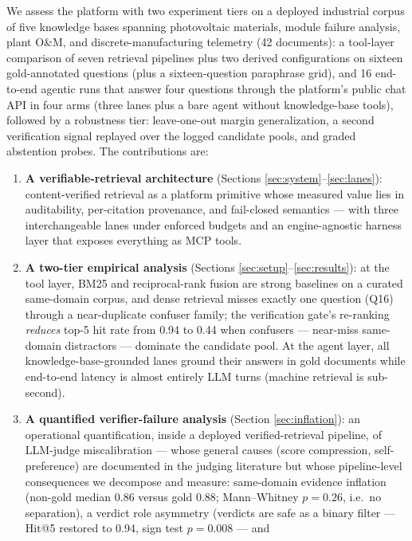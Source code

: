 We assess the platform with two experiment tiers on a deployed industrial
corpus of five knowledge bases spanning photovoltaic materials, module
failure analysis, plant O\&M, and discrete-manufacturing telemetry
(42 documents): a tool-layer
comparison of seven retrieval pipelines plus two derived configurations
on sixteen gold-annotated questions (plus a sixteen-question paraphrase
grid), and
16 end-to-end agentic runs that answer four questions through the platform's
public chat API in four arms (three lanes plus a bare agent without
knowledge-base tools), followed by a robustness tier: leave-one-out margin
generalization, a second verification signal replayed over the logged
candidate pools, and graded abstention probes. The contributions are:

\begin{enumerate}
\item \textbf{A verifiable-retrieval architecture} (Sections
\ref{sec:system}--\ref{sec:lanes}): content-verified retrieval as a
platform primitive whose measured value lies in auditability, per-citation
provenance, and fail-closed semantics --- with three interchangeable lanes
under enforced budgets and an engine-agnostic harness layer that exposes
everything as MCP tools.
\item \textbf{A two-tier empirical analysis} (Sections
\ref{sec:setup}--\ref{sec:results}): at the tool layer, BM25 and reciprocal-rank
fusion are strong baselines on a curated same-domain corpus, and dense
retrieval misses exactly one question (Q16) through a near-duplicate
confuser family; the
verification gate's re-ranking \emph{reduces} top-5 hit rate from 0.94 to
0.44 when confusers
--- near-miss same-domain distractors --- dominate the candidate pool. At
the agent layer, all knowledge-base-grounded lanes ground their answers in
gold documents while end-to-end latency is almost entirely LLM turns
(machine retrieval is sub-second).
\item \textbf{A quantified verifier-failure analysis} (Section
\ref{sec:inflation}): an operational quantification, inside a deployed
verified-retrieval pipeline, of LLM-judge miscalibration --- whose
general causes (score compression, self-preference) are documented in the
judging literature \cite{zheng-llmjudge,panickssery-selfpref} but whose
pipeline-level consequences we decompose and measure: same-domain evidence
inflation (non-gold median 0.86 versus gold 0.88; Mann--Whitney $p = 0.26$,
i.e.\ no separation), a verdict role asymmetry (verdicts are safe as a
binary filter --- Hit@5 restored to 0.94, sign test $p = 0.008$ --- and

\end{enumerate}
